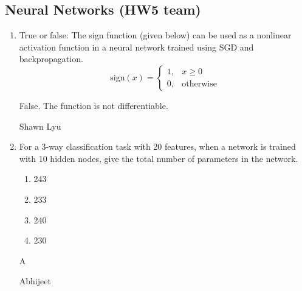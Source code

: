 \subsection{Neural Networks (HW5 team)}
\begin{enumerate}
    \item True or false: The sign function (given below) can be used as a nonlinear activation function in a neural network trained using SGD and backpropagation.
    \[\textrm{sign}(x) = \begin{cases}1, &x \geq 0\\0, &\textrm{otherwise}\end{cases}\]
    
    \begin{soln}
    False. The function is not differentiable.
    \end{soln}
    
    \begin{qauthor}
    Shawn Lyu
    \end{qauthor}
    
    
    \item     For a 3-way classification task with 20 features, when a network is trained with 10 hidden nodes, give the total number of parameters in the network.
    \begin{enumerate}
     \item 243
    
     \item 233
    
     \item 240
    
      \item 230
     \end{enumerate}    
    
    
     \begin{soln}
    
      A
 
    \end{soln}
    
        \begin{qauthor}
    Abhijeet 
    \end{qauthor}
    
    
    
\end{enumerate}